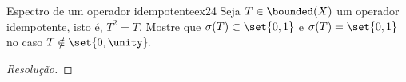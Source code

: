 \begin{exercício}{Espectro de um operador idempotente}{ex24}
  Seja \(T \in \bounded(X)\) um operador idempotente, isto é, \(T^2 = T.\) Mostre que \(\sigma(T) \subset \set{0,1}\) e \(\sigma(T) = \set{0,1}\) no caso \(T \notin \set{0,\unity}.\)
\end{exercício}
\begin{proof}[Resolução]

\end{proof}
